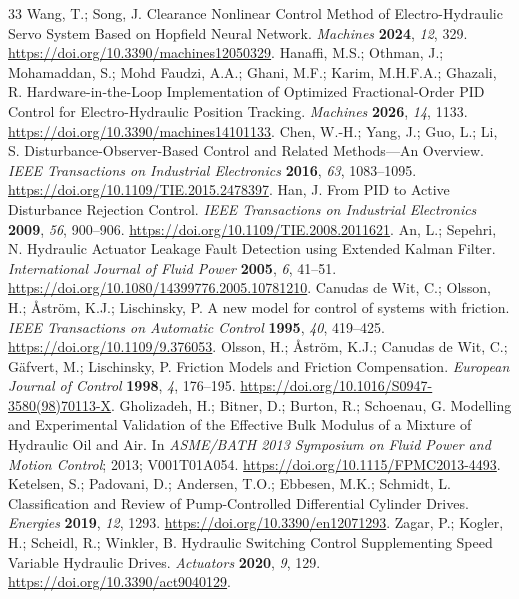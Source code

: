 \begin{thebibliography}{33}
 Wang, T.; Song, J. Clearance Nonlinear Control Method of Electro-Hydraulic Servo System Based on Hopfield Neural Network. \emph{Machines} \textbf{2024}, \emph{12}, 329. \url{https://doi.org/10.3390/machines12050329}.
 Hanaffi, M.S.; Othman, J.; Mohamaddan, S.; Mohd Faudzi, A.A.; Ghani, M.F.; Karim, M.H.F.A.; Ghazali, R. Hardware-in-the-Loop Implementation of Optimized Fractional-Order PID Control for Electro-Hydraulic Position Tracking. \emph{Machines} \textbf{2026}, \emph{14}, 1133. \url{https://doi.org/10.3390/machines14101133}.
 Chen, W.-H.; Yang, J.; Guo, L.; Li, S. Disturbance-Observer-Based Control and Related Methods---An Overview. \emph{IEEE Transactions on Industrial Electronics} \textbf{2016}, \emph{63}, 1083--1095. \url{https://doi.org/10.1109/TIE.2015.2478397}.
 Han, J. From PID to Active Disturbance Rejection Control. \emph{IEEE Transactions on Industrial Electronics} \textbf{2009}, \emph{56}, 900--906. \url{https://doi.org/10.1109/TIE.2008.2011621}.
 An, L.; Sepehri, N. Hydraulic Actuator Leakage Fault Detection using Extended Kalman Filter. \emph{International Journal of Fluid Power} \textbf{2005}, \emph{6}, 41--51. \url{https://doi.org/10.1080/14399776.2005.10781210}.
 Canudas de Wit, C.; Olsson, H.; \AA{}str\"om, K.J.; Lischinsky, P. A new model for control of systems with friction. \emph{IEEE Transactions on Automatic Control} \textbf{1995}, \emph{40}, 419--425. \url{https://doi.org/10.1109/9.376053}.
 Olsson, H.; \AA{}str\"om, K.J.; Canudas de Wit, C.; G\"afvert, M.; Lischinsky, P. Friction Models and Friction Compensation. \emph{European Journal of Control} \textbf{1998}, \emph{4}, 176--195. \url{https://doi.org/10.1016/S0947-3580(98)70113-X}.
 Gholizadeh, H.; Bitner, D.; Burton, R.; Schoenau, G. Modelling and Experimental Validation of the Effective Bulk Modulus of a Mixture of Hydraulic Oil and Air. In \emph{ASME/BATH 2013 Symposium on Fluid Power and Motion Control}; 2013; V001T01A054. \url{https://doi.org/10.1115/FPMC2013-4493}.
 Ketelsen, S.; Padovani, D.; Andersen, T.O.; Ebbesen, M.K.; Schmidt, L. Classification and Review of Pump-Controlled Differential Cylinder Drives. \emph{Energies} \textbf{2019}, \emph{12}, 1293. \url{https://doi.org/10.3390/en12071293}.
 Zagar, P.; Kogler, H.; Scheidl, R.; Winkler, B. Hydraulic Switching Control Supplementing Speed Variable Hydraulic Drives. \emph{Actuators} \textbf{2020}, \emph{9}, 129. \url{https://doi.org/10.3390/act9040129}.

\end{thebibliography}
